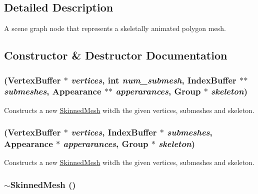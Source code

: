 \subsection{Detailed Description}
A scene graph node that represents a skeletally animated polygon mesh. 

\subsection{Constructor \& Destructor Documentation}
\hypertarget{classm3g_1_1SkinnedMesh_277419d6851b0e305f66a46095269915}{
\subsubsection[{SkinnedMesh}]{ ({\bf VertexBuffer} $\ast$ {\em vertices}, \/  int {\em num\_\-submesh}, \/  {\bf IndexBuffer} $\ast$$\ast$ {\em submeshes}, \/  {\bf Appearance} $\ast$$\ast$ {\em apperarances}, \/  Group $\ast$ {\em skeleton})}}
\label{classm3g_1_1SkinnedMesh_277419d6851b0e305f66a46095269915}


Constructs a new \hyperlink{classm3g_1_1SkinnedMesh}{SkinnedMesh} witdh the given vertices, submeshes and skeleton. \hypertarget{classm3g_1_1SkinnedMesh_094bf88089897beeb8b8776e3bbb299d}{
\subsubsection[{SkinnedMesh}]{ ({\bf VertexBuffer} $\ast$ {\em vertices}, \/  {\bf IndexBuffer} $\ast$ {\em submeshes}, \/  {\bf Appearance} $\ast$ {\em apperarances}, \/  Group $\ast$ {\em skeleton})}}
\label{classm3g_1_1SkinnedMesh_094bf88089897beeb8b8776e3bbb299d}


Constructs a new \hyperlink{classm3g_1_1SkinnedMesh}{SkinnedMesh} witdh the given vertices, submeshes and skeleton. \hypertarget{classm3g_1_1SkinnedMesh_c73da5b5c5f8f14fc241328b4b78928c}{
\subsubsection[{$\sim$SkinnedMesh}]{\setlength{\rightskip}{0pt plus 5cm}$\sim${\bf SkinnedMesh} ()}}
\label{classm3g_1_1SkinnedMesh_c73da5b5c5f8f14fc241328b4b78928c}


